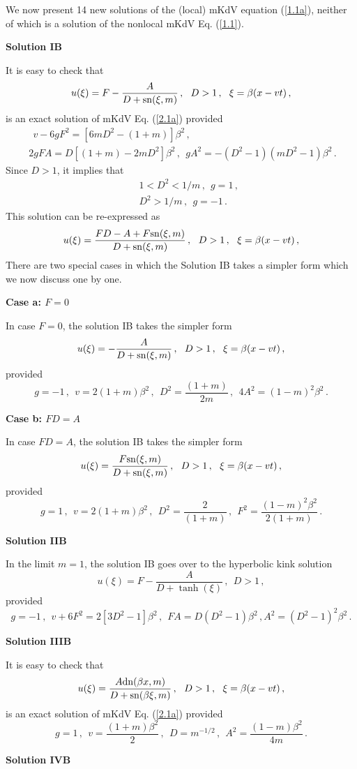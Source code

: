 \documentclass[11pt]{article}
\newcommand{\be}{\begin{equation}}
\newcommand{\ee}{\end{equation}}
\newcommand{\bea}{\begin{eqnarray}}
\newcommand{\eea}{\end{eqnarray}}
\newcommand{\sn}{{\rm sn}}
\newcommand{\dn}{{\rm dn}}
\begin{document}
We now present 14 new solutions of the (local) mKdV equation (\ref{1.1a}),
neither of which is a solution of the nonlocal mKdV Eq. (\ref{1.1}). 


{\bf Solution IB}

It is easy to check that
\be\label{B1}
u(\xi) = F - \frac{A}{D+\sn(\xi,m)}\,,~~D > 1\,,~~\xi = \beta(x-vt)\,,
\ee
is an exact solution of mKdV Eq. (\ref{2.1a}) provided
\bea\label{B2}
&&~~v -6g F^2 = [6m D^2-(1+m)]\beta^2\,, \nonumber \\
&&2gFA = D[(1+m)-2m D^2]\beta^2\,,~~gA^2 = -(D^2-1)(m D^2-1) \beta^2\,. ~~~~~~
\eea
Since $D > 1$, it implies that
\bea\label{B3}
&&1 < D^2 < 1/m\,,~~g = 1\,, \nonumber \\
&&D^2 > 1/m\,,~~g  = -1\,.
\eea
This solution can be re-expressed as
\be\label{B4}
u(\xi) = \frac{FD-A+F\sn(\xi,m)}{D+\sn(\xi,m)}\,,~~D > 1\,,
~~\xi = \beta(x-vt)\,,
\ee
There are two special cases in which the Solution IB takes a simpler
form which we now discuss one by one.

{\bf Case a: $F = 0$}

In case $F = 0$, the solution IB takes the simpler form
\be\label{B5}
u(\xi) = -\frac{A}{D+\sn(\xi,m)}\,,~~D > 1\,,~~\xi = \beta(x-vt)\,,
\ee
provided
\be\label{B6}
g = -1\,,~~v = 2(1+m)\beta^2\,,~~D^2 = \frac{(1+m)}{2m}\,,~~
4 A^2 = (1-m)^2 \beta^2\,.
\ee

{\bf Case b: $FD = A$}

In case $FD = A$, the solution IB takes the simpler form
\be\label{B7}
u(\xi) = \frac{F\sn(\xi,m)}{D+\sn(\xi,m)}\,,~~D > 1\,,~~\xi = \beta(x-vt)\,,
\ee
provided
\be\label{B8}
g = 1\,,~~v = 2(1+m)\beta^2\,,~~D^2 = \frac{2}{(1+m)}\,,~~
F^2 = \frac{(1-m)^2 \beta^2}{2(1+m)}\,.
\ee

{\bf Solution IIB}

In the limit $m = 1$, the solution  IB goes over to the hyperbolic 
kink solution
\be\label{B9}
u(\xi) = F - \frac{A}{D+\tanh(\xi)}\,,~~D > 1\,,
\ee
provided
\be\label{B10}
g = -1\,,~~v+6 F^2 = 2[3D^2-1]\beta^2\,,~~ FA = D(D^2-1)\beta^2\,,
A^2 = (D^2-1)^2 \beta^2\,.
\ee

{\bf Solution IIIB}

It is easy to check that
\be\label{B8a}
u(\xi) = \frac{A\dn(\beta x,m)}{D+\sn(\beta \xi,m)}\,,~~D > 1\,,
~~\xi = \beta(x-vt)\,,
\ee
is an exact solution of mKdV Eq. (\ref{2.1a}) provided
\be\label{B9a}
g = 1\,,~~v = \frac{(1+m)\beta^2}{2}\,,~~D = m^{-1/2}\,,
~~A^2 = \frac{(1-m)\beta^2}{4m}\,.
\ee

{\bf Solution IVB}
\end{document}
